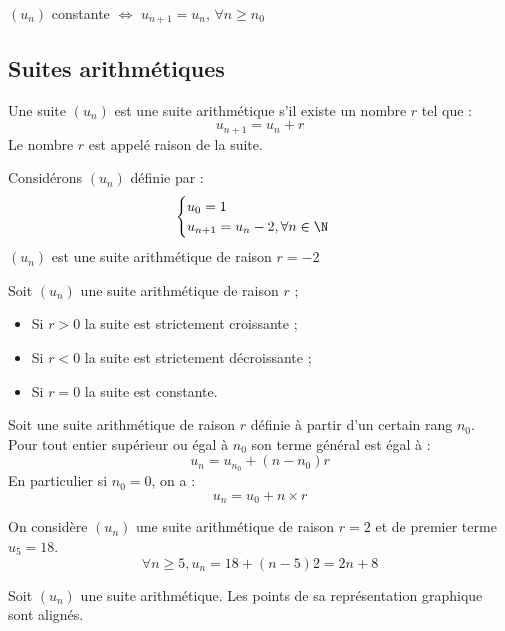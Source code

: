 \documentclass[11pt]{article}
\begin{document}
\begin{definition}
$(u_n)$ constante $\iff$ $u_{n+1}
= u_n$, $\forall n \ge n_0$
\end{definition}

\subsection{Suites arithmétiques}

\begin{definition}
Une suite $(u_n)$ est une suite arithmétique s'il existe un nombre $r$
tel que :
\[ u_{n+1} = u_n + r \]
Le nombre $r$ est appelé raison de la suite.
\end{definition}

\begin{exemple}
Considérons $(u_n)$ définie par :
\[ \begin{cases}
u_0 = 1 \\
u_{n+1} = u_n - 2, \forall n
\in \N
\end{cases} \]
$(u_n)$ est une suite arithmétique de raison $r=-2$
\end{exemple}

\begin{propriete}
Soit $(u_n)$ une suite arithmétique de raison $r$ ;
\begin{itemize}
\item Si $r > 0$ la suite est strictement croissante ;
\item Si $r < 0$ la suite est strictement décroissante ;
\item Si $r = 0$ la suite est constante.
\end{itemize}
\end{propriete}


\begin{theoreme}
Soit une suite arithmétique de raison $r$ définie à partir d'un
certain rang $n_0$.\\
Pour tout entier supérieur ou égal à $n_0$ son terme général est égal à :
\[ u_n = u_{n_0}+(n-n_0)r\]
En particulier si $n_0=0$, on a : 
\[ u_n = u_0 + n \times r\]
\end{theoreme}

\begin{exemple}
On considère $(u_n)$  une suite arithmétique de raison $r=2$ et de
premier terme $u_5=18$.
\[ \forall n \ge 5, u_n=18+(n-5)2 = 2n + 8\]
\end{exemple}

\begin{propriete}
Soit $(u_n)$ une suite arithmétique. Les points de sa représentation graphique sont alignés.
\end{propriete}
\end{document}

